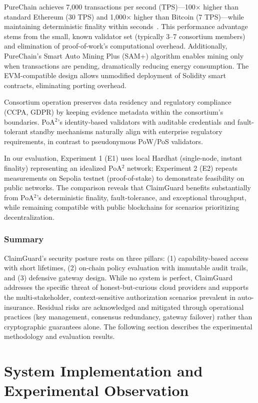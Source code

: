 \documentclass[final,5p,times,twocolumn]{elsarticle}
\begin{document}
PureChain achieves 7,000 transactions per second (TPS)—100× higher than standard Ethereum (30 TPS) and 1,000× higher than Bitcoin (7 TPS)—while maintaining deterministic finality within seconds~\cite{KIM2025100397}. This performance advantage stems from the small, known validator set (typically 3--7 consortium members) and elimination of proof-of-work's computational overhead. Additionally, PureChain's Smart Auto Mining Plus (SAM+) algorithm enables mining only when transactions are pending, dramatically reducing energy consumption. The EVM-compatible design allows unmodified deployment of Solidity smart contracts, eliminating porting overhead.

Consortium operation preserves data residency and regulatory compliance (CCPA, GDPR) by keeping evidence metadata within the consortium's boundaries. PoA$^2$'s identity-based validators with auditable credentials and fault-tolerant standby mechanisms naturally align with enterprise regulatory requirements, in contrast to pseudonymous PoW/PoS validators.

In our evaluation, Experiment 1 (E1) uses local Hardhat (single-node, instant finality) representing an idealized PoA$^2$ network; Experiment 2 (E2) repeats measurements on Sepolia testnet (proof-of-stake) to demonstrate feasibility on public networks. The comparison reveals that ClaimGuard benefits substantially from PoA$^2$'s deterministic finality, fault-tolerance, and exceptional throughput, while remaining compatible with public blockchains for scenarios prioritizing decentralization.


\subsubsection{Summary}
ClaimGuard's security posture rests on three pillars: (1) capability-based access with short lifetimes, (2) on-chain policy evaluation with immutable audit trails, and (3) defensive gateway design. While no system is perfect, ClaimGuard addresses the specific threat of honest-but-curious cloud providers and supports the multi-stakeholder, context-sensitive authorization scenarios prevalent in auto-insurance. Residual risks are acknowledged and mitigated through operational practices (key management, consensus redundancy, gateway failover) rather than cryptographic guarantees alone. The following section describes the experimental methodology and evaluation results.


\section{System Implementation and Experimental Observation}
\label{sec:implementation-and-observation}
\end{document}

